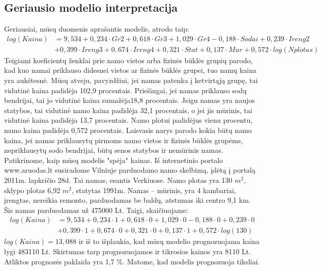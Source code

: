 \documentclass[a4paper]{article}
\begin{document}
\subsection{Geriausio modelio interpretacija}
\hspace*{0,52cm}Geriausiai, mūsų duomenis aprašantis modelis, atrodo taip:
\begin{align*}
log(Kaina)&=9,534+0,234\cdot Gr2+0,618\cdot Gr3+1,029\cdot Gr4 -0,188\cdot Sodai+0,239\cdot Ireng2\\
&+0,399\cdot Ireng3+0,674\cdot Ireng4+0,321\cdot Stat+0,137\cdot Mur+0,572\cdot log(Nplotas)
\end{align*}
\hspace*{0,52cm}Teigiami koeficientų ženklai prie namo vietos arba fizinės būklės grupių parodo, kad kuo namai priklauso didesnei vietos ar fizinės būklės grupei, tuo namų kaina yra aukštesnė. Mūsų atveju, pavyzdžiui, jei namas patenka į ketvirtąją grupę, tai vidutinė kaina padidėja 102,9 procentais. Priešingai, jei namas priklauso sodų bendrijai, tai jo vidutinė kaina sumažėja18,8 procentais. 
Jeigu namas yra naujos statybos, tai vidutinė namo kaina padidėja 32,1 procentais, o jei jis mūrinis, tai vidutinė kaina padidėja 13,7 procentais. Namo plotui padidėjus vienu procentu, namo kaina padidėja 0,572 procentais. Laisvasis narys parodo kokia būtų namo kaina, jei namas priklausytų pirmoms namo vietos ir fizinės būklės grupėms, nepriklausytų sodo bendrijai, būtų senos statybos ir nemūrinis namas. \\
\hspace*{0,52cm}Patikrinome, kaip mūsų modelis "spėja" kainas. Iš internetinio portalo www.aruodas.lt susiradome Vilniuje parduodamo namo skelbimą, įdėtą į portalą 2011m. lapkričio 28d. Tai namas, esantis Verkiuose. Namo plotas yra 130 $m^2$, sklypo plotas 6,92 $m^2$, statytas 1991m. Namas -- mūrinis, yra 4 kambariai, įrengtas, nereikia remonto, parduodamas be baldų, atstumas iki centro 9,1 km. Šis namas parduodamas už 475000 Lt. Taigi, skaičiuojame:
\begin{align*}
log(Kaina)&=9,534+0,234\cdot 1+0,618\cdot 0+1,029\cdot 0 -0,188\cdot 0+0,239\cdot 0\\
&+0,399\cdot 1+0,674\cdot 0+0,321\cdot 0+0,137\cdot 1+0,572\cdot log(130)
\end{align*}
$log(Kaina)=13,088$ ir iš to išplaukia, kad mūsų modelio prognozuojama kaina lygi 483110 Lt. Skirtumas tarp prognozuojamos ir tikrosios kainos yra 8110 Lt. Atliktos prognozės paklaida yra 1,7 \%. Matome, kad modelis prognozuoja tiksliai.
\newpage
\end{document}
